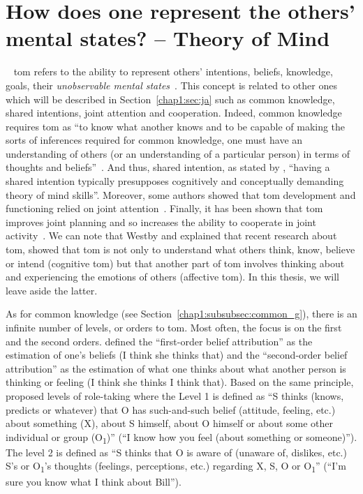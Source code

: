 \documentclass[a4paper,11pt,twoside]{StyleThese}
\begin{document}
\section{How does one represent the others' mental states? -- Theory of Mind}~\label{chap1:sec:tom}
\acrfull{tom} refers to the ability to represent others' intentions, beliefs, knowledge, goals, \ie their \emph{unobservable mental states}~\citep{premack_1978_does,povinelli_2004_we}. This concept is related to other ones which will be described in Section~\ref{chap1:sec:ja} such as common knowledge, shared intentions, joint attention and cooperation. Indeed, common knowledge requires \acrshort{tom} as ``to know what another knows and to be capable of making the sorts of inferences required for common knowledge, one must have an understanding of others (or an understanding of a particular person) in terms of thoughts and beliefs''~\citep[p.~82]{tollefsen_2005_let}. And thus, shared intention, as stated by \citet[p.~1817]{pacherie_2013_intentional}, ``having a shared intention typically presupposes cognitively and conceptually demanding theory of mind skills''. Moreover, some authors showed that \acrshort{tom} development and functioning relied on joint attention~\citep{sodian_2015_declarative, camaioni_2004_role}.  Finally, it has been shown that \acrshort{tom} improves joint planning and so increases the ability to cooperate in joint activity~\citep{astington_1995_theory}. We can note that Westby and \cite{westby_2014_developmental} explained that recent research about \acrshort{tom}, showed that \acrshort{tom} is not only to understand what others think, know, believe or intend (cognitive \acrshort{tom}) but that another part of \acrshort{tom} involves thinking about and experiencing the emotions of others (affective \acrshort{tom}). In this thesis, we will leave aside the latter.

As for common knowledge (see Section~\ref{chap1:subsubsec:common_g}), there is an infinite number of levels, or orders to \acrshort{tom}. Most often, the focus is on the first and the second orders. \cite{perner_1985_john} defined the ``first-order belief attribution'' as the estimation of one's beliefs (\eg I think she thinks that) and the ``second-order belief attribution'' as the estimation of what one  thinks about what another person is thinking or feeling (\eg I think she thinks I think that). Based on the same principle, \citet[pp.~49--51]{flavell_1968_development} proposed levels of role-taking where the Level 1 is defined as ``S thinks (knows, predicts or whatever) that O has such-and-such belief (attitude, feeling, etc.) about something (X), about S himself, about O himself or about some other individual or group (O\textsubscript{1})'' (\eg ``I know how you feel (about something or someone)''). The level 2 is defined as ``S thinks that O is aware of (unaware of, dislikes, etc.) S's or O\textsubscript{1}'s thoughts (feelings, perceptions, etc.) regarding X, S, O or O\textsubscript{1}'' (\eg ``I'm sure you know what I think about Bill'').
\end{document}

